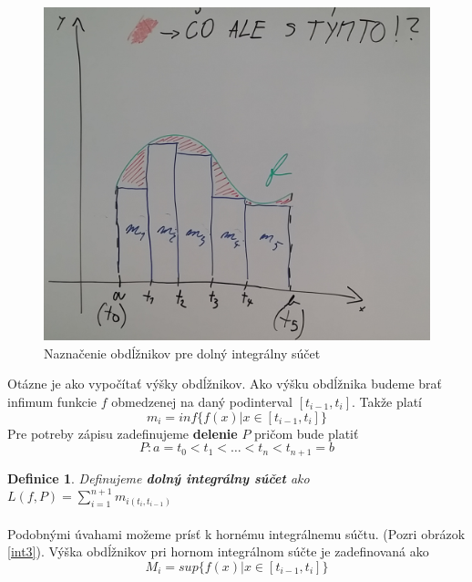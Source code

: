 \documentclass[12pt,a4paper]{article}
\newtheorem{definition}{Definice}
\begin{document}
\begin{figure}[H]
	\begin{center}
		\includegraphics[scale=0.25]{img/int2}
	\end{center}
	\caption{Naznačenie obdĺžnikov pre dolný integrálny súčet\label{int2}}
\end{figure}

Otázne je ako vypočítať výšky obdĺžnikov. Ako výšku obdĺžnika budeme brať infimum funkcie $f$ obmedzenej na daný podinterval $[t_{i-1}, t_{i}]$. Takže platí $$m_{i}=inf\{ f(x)|x\in [t_{i-1}, t_{i}]\}$$ Pre potreby zápisu zadefinujeme \textbf{delenie} $P$ pričom bude platiť $$P: a=t_{0}<t_{1}<\dots <t_{n}<t_{n+1}=b$$

\begin{definition}
	Definujeme \textbf{dolný integrálny súčet} ako $L(f, P)=\sum_{i=1}^{n+1}m_{i(t_{i}, t_{i-1})}$
\end{definition}

\paragraph{}
Podobnými úvahami možeme prísť k hornému integrálnemu súčtu. (Pozri obrázok \ref{int3}). Výška obdĺžnikov pri hornom integrálnom súčte je zadefinovaná ako $$M_{i}=sup\{ f(x)|x\in [t_{i-1}, t_{i}]\}$$
\end{document}
